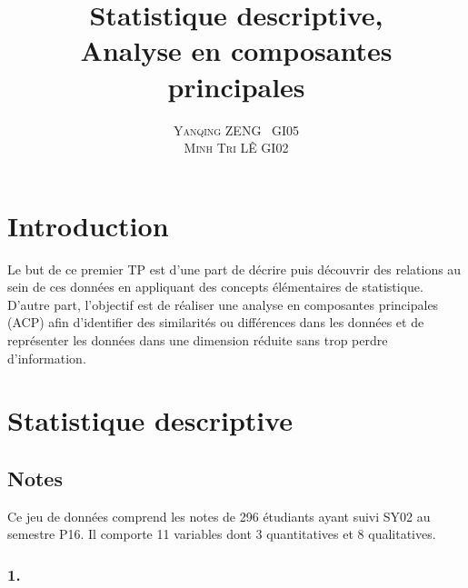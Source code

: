 \documentclass{article}
\title{\vspace{-15mm}\fontsize{24pt}{10pt}\selectfont\textbf{Statistique descriptive,\\Analyse en composantes principales}} %
\author{
\large
{\textsc{Yanqing ZENG~ GI05}}\\
{\textsc{Minh Tri LÊ GI02}}
}
\begin{document}
\maketitle %
\thispagestyle{fancy} %


\section*{Introduction}
Le but de ce premier TP est d'une part de décrire puis découvrir des relations au sein de ces données en appliquant des concepts élémentaires de statistique.
D'autre part, l'objectif est de réaliser une analyse en composantes principales (ACP) afin d'identifier des similarités ou différences dans les données et de représenter les données dans une dimension réduite sans trop perdre d'information. %

\section{Statistique descriptive}


\subsection{Notes}
Ce jeu de données comprend les notes de 296 étudiants ayant suivi SY02 au semestre P16. Il comporte 11 variables dont 3 quantitatives et 8 qualitatives.


\subsubsection*{1.}\label{1.1.1}
\end{document}
